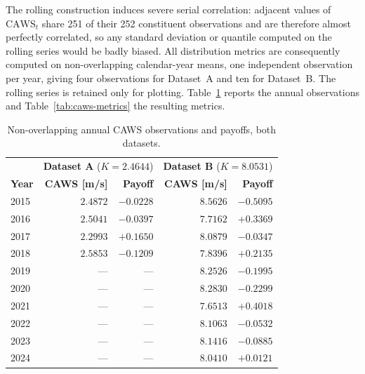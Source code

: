 \documentclass[11pt, a4paper, twoside]{article}
\begin{document}
The rolling construction induces severe serial correlation: adjacent values of $\mathrm{CAWS}_t$ share 251 of their 252 constituent observations and are therefore almost perfectly correlated, so any standard deviation or quantile computed on the rolling series would be badly biased. All distribution metrics are consequently computed on non-overlapping calendar-year means, one independent observation per year, giving four observations for Dataset~A and ten for Dataset~B. The rolling series is retained only for plotting. Table~\ref{tab:caws-annual} reports the annual observations and Table~\ref{tab:caws-metrics} the resulting metrics.

\begin{table}[htbp]
\centering
\caption{Non-overlapping annual CAWS observations and payoffs, both datasets.}
\label{tab:caws-annual}
\begin{tabular}{l r r r r}
\toprule
& \multicolumn{2}{c}{\textbf{Dataset A} ($K = 2.4644$)} & \multicolumn{2}{c}{\textbf{Dataset B} ($K = 8.0531$)} \\
\textbf{Year} & \textbf{CAWS [m/s]} & \textbf{Payoff} & \textbf{CAWS [m/s]} & \textbf{Payoff} \\
\midrule
2015 & $2.4872$ & $-0.0228$ & $8.5626$ & $-0.5095$ \\
2016 & $2.5041$ & $-0.0397$ & $7.7162$ & $+0.3369$ \\
2017 & $2.2993$ & $+0.1650$ & $8.0879$ & $-0.0347$ \\
2018 & $2.5853$ & $-0.1209$ & $7.8396$ & $+0.2135$ \\
2019 & --- & --- & $8.2526$ & $-0.1995$ \\
2020 & --- & --- & $8.2830$ & $-0.2299$ \\
2021 & --- & --- & $7.6513$ & $+0.4018$ \\
2022 & --- & --- & $8.1063$ & $-0.0532$ \\
2023 & --- & --- & $8.1416$ & $-0.0885$ \\
2024 & --- & --- & $8.0410$ & $+0.0121$ \\
\bottomrule
\end{tabular}
\end{table}
\end{document}
